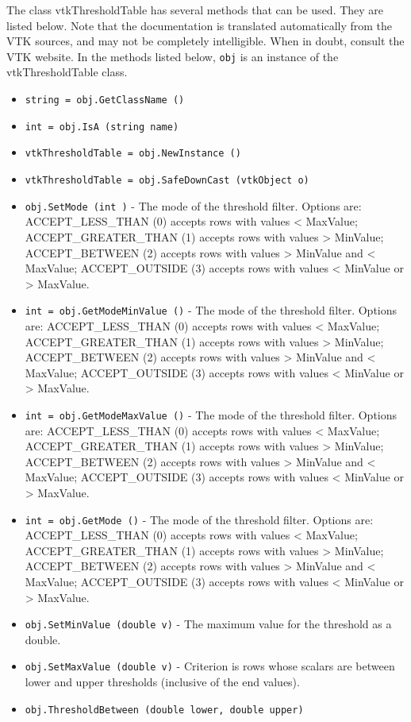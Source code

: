 The class vtkThresholdTable has several methods that can be used.
  They are listed below.
Note that the documentation is translated automatically from the VTK sources,
and may not be completely intelligible.  When in doubt, consult the VTK website.
In the methods listed below, \verb|obj| is an instance of the vtkThresholdTable class.
\begin{itemize}
\item  \verb|string = obj.GetClassName ()|

\item  \verb|int = obj.IsA (string name)|

\item  \verb|vtkThresholdTable = obj.NewInstance ()|

\item  \verb|vtkThresholdTable = obj.SafeDownCast (vtkObject o)|

\item  \verb|obj.SetMode (int )| -  The mode of the threshold filter.  Options are:
 ACCEPT\_LESS\_THAN (0) accepts rows with values < MaxValue;
 ACCEPT\_GREATER\_THAN (1) accepts rows with values > MinValue;
 ACCEPT\_BETWEEN (2) accepts rows with values > MinValue and < MaxValue;
 ACCEPT\_OUTSIDE (3) accepts rows with values < MinValue or > MaxValue.

\item  \verb|int = obj.GetModeMinValue ()| -  The mode of the threshold filter.  Options are:
 ACCEPT\_LESS\_THAN (0) accepts rows with values < MaxValue;
 ACCEPT\_GREATER\_THAN (1) accepts rows with values > MinValue;
 ACCEPT\_BETWEEN (2) accepts rows with values > MinValue and < MaxValue;
 ACCEPT\_OUTSIDE (3) accepts rows with values < MinValue or > MaxValue.

\item  \verb|int = obj.GetModeMaxValue ()| -  The mode of the threshold filter.  Options are:
 ACCEPT\_LESS\_THAN (0) accepts rows with values < MaxValue;
 ACCEPT\_GREATER\_THAN (1) accepts rows with values > MinValue;
 ACCEPT\_BETWEEN (2) accepts rows with values > MinValue and < MaxValue;
 ACCEPT\_OUTSIDE (3) accepts rows with values < MinValue or > MaxValue.

\item  \verb|int = obj.GetMode ()| -  The mode of the threshold filter.  Options are:
 ACCEPT\_LESS\_THAN (0) accepts rows with values < MaxValue;
 ACCEPT\_GREATER\_THAN (1) accepts rows with values > MinValue;
 ACCEPT\_BETWEEN (2) accepts rows with values > MinValue and < MaxValue;
 ACCEPT\_OUTSIDE (3) accepts rows with values < MinValue or > MaxValue.

\item  \verb|obj.SetMinValue (double v)| -  The maximum value for the threshold as a double.

\item  \verb|obj.SetMaxValue (double v)| -  Criterion is rows whose scalars are between lower and upper thresholds
 (inclusive of the end values).

\item  \verb|obj.ThresholdBetween (double lower, double upper)|

\end{itemize}
